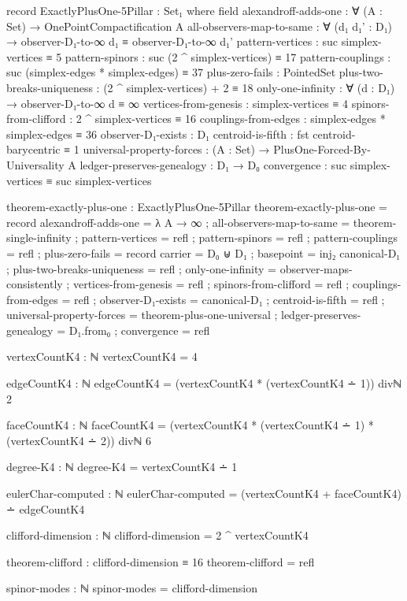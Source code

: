 \documentclass[11pt,a4paper]{book}
\begin{document}
\begin{code}
record ExactlyPlusOne-5Pillar : Set₁ where
  field
    alexandroff-adds-one : ∀ (A : Set) → OnePointCompactification A
    all-observers-map-to-same : ∀ (d₁ d₁' : D₁) → 
      observer-D₁-to-∞ d₁ ≡ observer-D₁-to-∞ d₁'
    pattern-vertices : suc simplex-vertices ≡ 5
    pattern-spinors : suc (2 ^ simplex-vertices) ≡ 17
    pattern-couplings : suc (simplex-edges * simplex-edges) ≡ 37
    plus-zero-fails : PointedSet
    plus-two-breaks-uniqueness : (2 ^ simplex-vertices) + 2 ≡ 18
    only-one-infinity : ∀ (d : D₁) → observer-D₁-to-∞ d ≡ ∞
    vertices-from-genesis : simplex-vertices ≡ 4
    spinors-from-clifford : 2 ^ simplex-vertices ≡ 16
    couplings-from-edges : simplex-edges * simplex-edges ≡ 36
    observer-D₁-exists : D₁
    centroid-is-fifth : fst centroid-barycentric ≡ 1
    universal-property-forces : (A : Set) → PlusOne-Forced-By-Universality A
    ledger-preserves-genealogy : D₁ → D₀
    convergence : suc simplex-vertices ≡ suc simplex-vertices

theorem-exactly-plus-one : ExactlyPlusOne-5Pillar
theorem-exactly-plus-one = record
  { alexandroff-adds-one = λ A → ∞
  ; all-observers-map-to-same = theorem-single-infinity
  ; pattern-vertices = refl
  ; pattern-spinors = refl
  ; pattern-couplings = refl
  ; plus-zero-fails = record { carrier = D₀ ⊎ D₁ ; basepoint = inj₂ canonical-D₁ }
  ; plus-two-breaks-uniqueness = refl
  ; only-one-infinity = observer-maps-consistently
   ; vertices-from-genesis = refl
  ; spinors-from-clifford = refl
  ; couplings-from-edges = refl
  ; observer-D₁-exists = canonical-D₁
  ; centroid-is-fifth = refl
  ; universal-property-forces = theorem-plus-one-universal
  ; ledger-preserves-genealogy = D₁.from₀
  ; convergence = refl
  }

vertexCountK4 : ℕ
vertexCountK4 = 4

edgeCountK4 : ℕ
edgeCountK4 = (vertexCountK4 * (vertexCountK4 ∸ 1)) divℕ 2


faceCountK4 : ℕ
faceCountK4 = (vertexCountK4 * (vertexCountK4 ∸ 1) * (vertexCountK4 ∸ 2)) divℕ 6


degree-K4 : ℕ
degree-K4 = vertexCountK4 ∸ 1


eulerChar-computed : ℕ
eulerChar-computed = (vertexCountK4 + faceCountK4) ∸ edgeCountK4


clifford-dimension : ℕ
clifford-dimension = 2 ^ vertexCountK4

theorem-clifford : clifford-dimension ≡ 16
theorem-clifford = refl

spinor-modes : ℕ
spinor-modes = clifford-dimension


\end{code}
\end{document}
